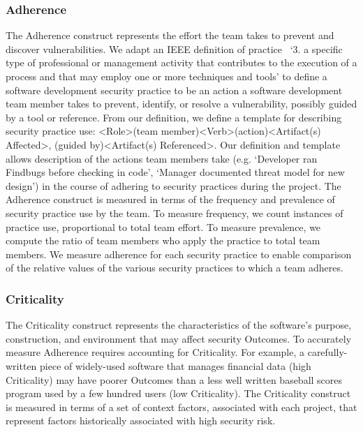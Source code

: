 \subsubsection{Adherence}
\label{sec:model_contruct_adherence}
The Adherence construct represents the effort the team takes to prevent and discover vulnerabilities. We adapt an IEEE definition of practice~\cite{ieee1990glossary} `3. a specific type of professional or management activity that contributes to 
the execution of a process and that may employ one or more techniques and tools' to define a software development security practice to be an action a software development team member takes to prevent, identify, or resolve a vulnerability, possibly guided by a tool or reference. From our definition, we define a template for describing security practice use: \textless Role\textgreater (team member)\textless Verb\textgreater (action)\textless Artifact(s) Affected\textgreater, (guided by)\textless Artifact(s) Referenced\textgreater. Our definition and template allows description of the actions team members take (e.g. `Developer ran Findbugs before checking in code', `Manager documented threat model for new design') in the course of adhering to security practices during the project. The Adherence construct is measured in terms of the frequency and prevalence of security practice use by the team. To measure frequency, we count instances of practice use, proportional to total team effort. To measure prevalence, we compute the ratio of team members who apply the practice to total team members. We measure adherence for each security practice to enable comparison of the relative values of the various security practices to which a team adheres.

\subsubsection{Criticality}
The Criticality construct represents the characteristics of the software's purpose, construction, and environment that may affect security Outcomes. To accurately measure Adherence requires accounting for Criticality. For example, a carefully-written piece of widely-used software that manages financial data (high Criticality) may have poorer Outcomes than a less well written baseball scores program used by a few hundred users (low Criticality). The Criticality construct is measured in terms of a set of context factors, associated with each project, that represent factors historically associated with high security risk. 

